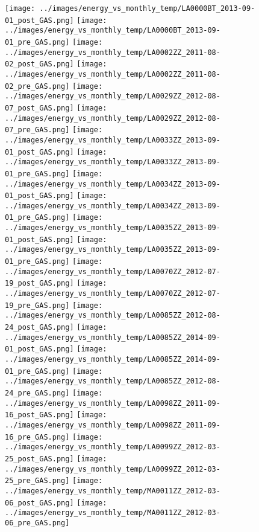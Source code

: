 \clearpage
\begin{figure}
\centering
\texttt{[image: ../images/energy\_vs\_monthly\_temp/LA0000BT\_2013-09-01\_post\_GAS.png]}
\texttt{[image: ../images/energy\_vs\_monthly\_temp/LA0000BT\_2013-09-01\_pre\_GAS.png]}
\texttt{[image: ../images/energy\_vs\_monthly\_temp/LA0002ZZ\_2011-08-02\_post\_GAS.png]}
\texttt{[image: ../images/energy\_vs\_monthly\_temp/LA0002ZZ\_2011-08-02\_pre\_GAS.png]}
\texttt{[image: ../images/energy\_vs\_monthly\_temp/LA0029ZZ\_2012-08-07\_post\_GAS.png]}
\texttt{[image: ../images/energy\_vs\_monthly\_temp/LA0029ZZ\_2012-08-07\_pre\_GAS.png]}
\texttt{[image: ../images/energy\_vs\_monthly\_temp/LA0033ZZ\_2013-09-01\_post\_GAS.png]}
\texttt{[image: ../images/energy\_vs\_monthly\_temp/LA0033ZZ\_2013-09-01\_pre\_GAS.png]}
\texttt{[image: ../images/energy\_vs\_monthly\_temp/LA0034ZZ\_2013-09-01\_post\_GAS.png]}
\texttt{[image: ../images/energy\_vs\_monthly\_temp/LA0034ZZ\_2013-09-01\_pre\_GAS.png]}
\texttt{[image: ../images/energy\_vs\_monthly\_temp/LA0035ZZ\_2013-09-01\_post\_GAS.png]}
\texttt{[image: ../images/energy\_vs\_monthly\_temp/LA0035ZZ\_2013-09-01\_pre\_GAS.png]}
\texttt{[image: ../images/energy\_vs\_monthly\_temp/LA0070ZZ\_2012-07-19\_post\_GAS.png]}
\texttt{[image: ../images/energy\_vs\_monthly\_temp/LA0070ZZ\_2012-07-19\_pre\_GAS.png]}
\texttt{[image: ../images/energy\_vs\_monthly\_temp/LA0085ZZ\_2012-08-24\_post\_GAS.png]}
\texttt{[image: ../images/energy\_vs\_monthly\_temp/LA0085ZZ\_2014-09-01\_post\_GAS.png]}
\texttt{[image: ../images/energy\_vs\_monthly\_temp/LA0085ZZ\_2014-09-01\_pre\_GAS.png]}
\texttt{[image: ../images/energy\_vs\_monthly\_temp/LA0085ZZ\_2012-08-24\_pre\_GAS.png]}
\texttt{[image: ../images/energy\_vs\_monthly\_temp/LA0098ZZ\_2011-09-16\_post\_GAS.png]}
\texttt{[image: ../images/energy\_vs\_monthly\_temp/LA0098ZZ\_2011-09-16\_pre\_GAS.png]}
\texttt{[image: ../images/energy\_vs\_monthly\_temp/LA0099ZZ\_2012-03-25\_post\_GAS.png]}
\texttt{[image: ../images/energy\_vs\_monthly\_temp/LA0099ZZ\_2012-03-25\_pre\_GAS.png]}
\texttt{[image: ../images/energy\_vs\_monthly\_temp/MA0011ZZ\_2012-03-06\_post\_GAS.png]}
\texttt{[image: ../images/energy\_vs\_monthly\_temp/MA0011ZZ\_2012-03-06\_pre\_GAS.png]}
\end{figure}
